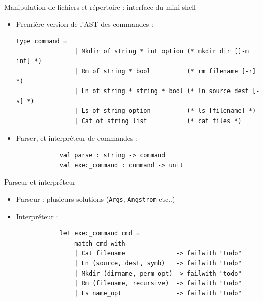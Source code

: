 \begin{frame}[fragile]{Manipulation de fichiers et répertoire : interface du mini-shell}
    \begin{itemize}[leftmargin=-12pt]
    \item<1->Première version de l'AST des commandes :
        \begin{lstlisting}[breaklines=false]
            type command =
                | Mkdir of string * int option (* mkdir dir []-m int] *)
                | Rm of string * bool          (* rm filename [-r] *)  
                | Ln of string * string * bool (* ln source dest [-s] *)
                | Ls of string option          (* ls [filename] *)
                | Cat of string list           (* cat files *)
        \end{lstlisting}
        
    \item<2-> Parser, et interpréteur de commandes :
         \begin{lstlisting}
            val parse : string -> command
            val exec_command : command -> unit 
        \end{lstlisting}
    \end{itemize}
\end{frame}  

\begin{frame}[fragile]{Parseur et interpréteur}

    \begin{itemize}[label=\small{}]
    \item<1-> Parseur : plusieurs solutions (\texttt{Args}, \texttt{Angstrom} etc..)
    \item<2-> Interpréteur : 
      \begin{lstlisting}
            let exec_command cmd = 
                match cmd with
                | Cat filename              -> failwith "todo"
                | Ln (source, dest, symb)   -> failwith "todo"
                | Mkdir (dirname, perm_opt) -> failwith "todo"
                | Rm (filename, recursive)  -> failwith "todo"
                | Ls name_opt               -> failwith "todo"
        \end{lstlisting}
    \end{itemize}
\end{frame} 

